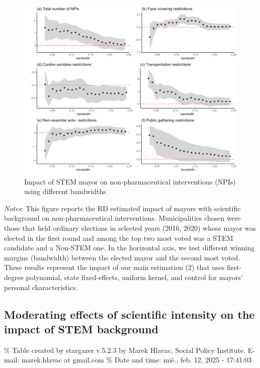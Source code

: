 \documentclass[
  letterpaper,
  DIV=11,
  numbers=noendperiod]{scrartcl}
\begin{document}
\begin{figure}[H]

\caption{Impact of STEM mayor on non-pharmaceutical interventions (NPIs)
using different bandwidths}

{\centering \includegraphics{outputs/figures/npi_rob.png}

}

\end{figure}%

\emph{Notes}: This figure reports the RD estimated impact of mayors with
scientific background on non-pharmaceutical interventions.
Municipalities chosen were those that held ordinary elections in
selected years (2016, 2020) whose mayor was elected in the first round
and among the top two most voted was a STEM candidate and a Non-STEM
one. In the horizontal axis, we test different winning margins
(bandwidth) between the elected mayor and the second most voted. These
results represent the impact of our main estimation (2) that uses
first-degree polynomial, state fixed-effects, uniform kernel, and
control for mayors' personal characteristics.

\subsection{Moderating effects of scientific intensity on the impact of
STEM
background}\label{moderating-effects-of-scientific-intensity-on-the-impact-of-stem-background}

\% Table created by stargazer v.5.2.3 by Marek Hlavac, Social Policy
Institute. E-mail: marek.hlavac at gmail.com \% Date and time: mié.,
feb. 12, 2025 - 17:41:03
\end{document}

